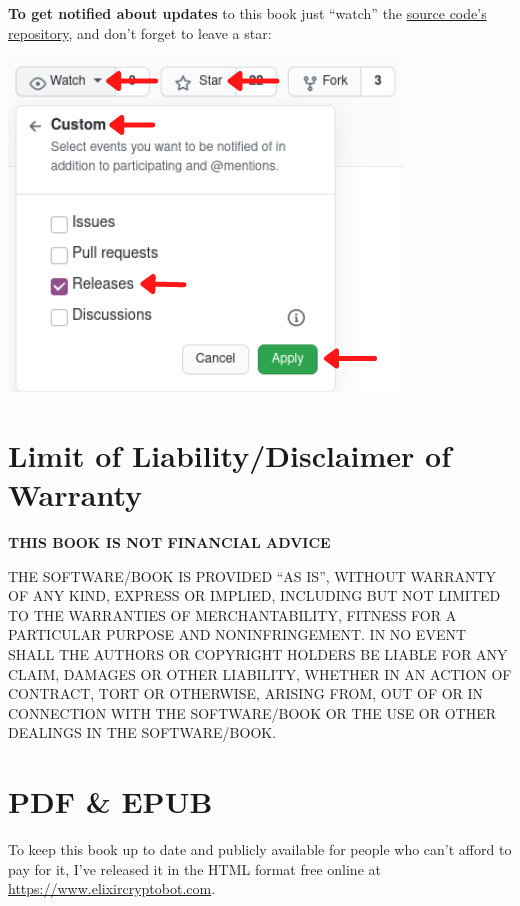 \documentclass[
  oneside]{book}
\begin{document}
\textbf{To get notified about updates} to this book just ``watch'' the \href{https://github.com/Cinderella-Man/hands-on-elixir-and-otp-cryptocurrency-trading-bot}{source code's repository}, and don't forget to leave a star:

\begin{center}\includegraphics[width=0.6\linewidth]{images/watch_book_howto} \end{center}

\newpage

\section*{Limit of Liability/Disclaimer of Warranty}\label{limit-of-liabilitydisclaimer-of-warranty}

\textbf{THIS BOOK IS NOT FINANCIAL ADVICE}

THE SOFTWARE/BOOK IS PROVIDED ``AS IS'', WITHOUT WARRANTY OF ANY KIND, EXPRESS OR IMPLIED, INCLUDING BUT NOT LIMITED TO THE WARRANTIES OF MERCHANTABILITY, FITNESS FOR A PARTICULAR PURPOSE AND NONINFRINGEMENT. IN NO EVENT SHALL THE AUTHORS OR COPYRIGHT HOLDERS BE LIABLE FOR ANY CLAIM, DAMAGES OR OTHER LIABILITY, WHETHER IN AN ACTION OF CONTRACT, TORT OR OTHERWISE, ARISING FROM, OUT OF OR IN CONNECTION WITH THE SOFTWARE/BOOK OR THE USE OR OTHER DEALINGS IN THE SOFTWARE/BOOK.

\section*{PDF \& EPUB}\label{pdf-epub}

To keep this book up to date and publicly available for people who can't afford to pay for it, I've released it in the HTML format free online at \url{https://www.elixircryptobot.com}.
\end{document}
